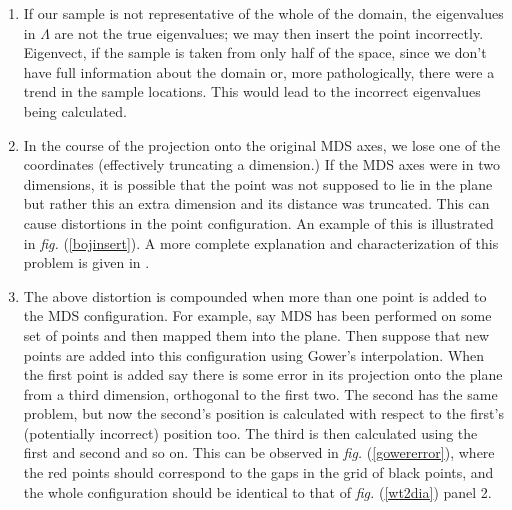 \documentclass[a4paper,10pt]{amsart}
\newcommand{\fig}[1]{\emph{fig.} (\ref{#1})}
\begin{document}
\begin{enumerate}
\item If our sample is not representative of the whole of the domain, the eigenvalues in $\Lambda$ are not the true eigenvalues; we may then insert the point incorrectly. Eigenvect, if the sample is taken from only half of the space, since we don't have full information about the domain or, more pathologically, there were a trend in the sample locations. This would lead to the incorrect eigenvalues being calculated.

\item In the course of the projection onto the original MDS axes, we lose one of the coordinates (effectively truncating a dimension.) If the MDS axes were in two dimensions, it is possible that the point was not supposed to lie in the plane but rather this an extra dimension and its distance was truncated. This can cause distortions in the point configuration. An example of this is illustrated in \fig{bojinsert}. A more complete explanation and characterization of this problem is given in \cite{Boj2009}. 

\item The above distortion is compounded when more than one point is added to the MDS configuration. For example, say MDS has been performed on some set of points and then mapped them into the plane. Then suppose that new points are added into this configuration using Gower's interpolation. When the first point is added say there is some error in its projection onto the plane from a third dimension, orthogonal to the first two. The second has the same problem, but now the second's position is calculated with respect to the first's (potentially incorrect) position too. The third is then calculated using the first and second and so on. This can be observed in \fig{gowererror}, where the red points should correspond to the gaps in the grid of black points, and the whole configuration should be identical to that of \fig{wt2dia} panel 2. 

\end{enumerate}
\end{document}

